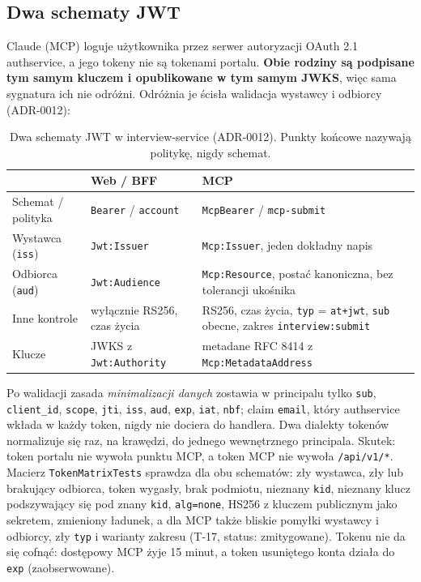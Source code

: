 \subsection{Dwa schematy JWT}

Claude (MCP) loguje użytkownika przez serwer autoryzacji OAuth 2.1 authservice, a jego tokeny
nie są tokenami portalu. \textbf{Obie rodziny są podpisane tym samym kluczem i
opublikowane w tym samym JWKS}, więc sama sygnatura ich nie odróżni. Odróżnia je
ścisła walidacja wystawcy i odbiorcy (ADR-0012):

\begin{table}[htbp]
\centering
\small
\begin{tabularx}{\linewidth}{@{}>{\raggedright\arraybackslash}p{2.7cm}>{\raggedright\arraybackslash}X>{\raggedright\arraybackslash}X@{}}
\toprule
 & \textbf{Web / BFF} & \textbf{MCP} \\
\midrule
Schemat / polityka & \texttt{Bearer} / \texttt{account} & \texttt{McpBearer} / \texttt{mcp-submit} \\
Wystawca (\texttt{iss}) & \texttt{Jwt:Issuer} & \texttt{Mcp:Issuer}, jeden dokładny napis \\
Odbiorca (\texttt{aud}) & \texttt{Jwt:Audience} & \texttt{Mcp:Resource}, postać kanoniczna, bez tolerancji ukośnika \\
Inne kontrole & wyłącznie RS256, czas życia & RS256, czas życia, \texttt{typ} = \texttt{at+jwt}, \texttt{sub} obecne, zakres \texttt{interview:submit} \\
Klucze & JWKS z \texttt{Jwt:Authority} & metadane RFC 8414 z \texttt{Mcp:MetadataAddress} \\
\bottomrule
\end{tabularx}
\caption{Dwa schematy JWT w interview-service (ADR-0012). Punkty końcowe nazywają politykę, nigdy schemat.}
\label{tab:p3-jwt}
\end{table}

Po walidacji zasada \emph{minimalizacji danych} zostawia w principalu tylko
\texttt{sub}, \texttt{client\_id}, \texttt{scope}, \texttt{jti}, \texttt{iss},
\texttt{aud}, \texttt{exp}, \texttt{iat}, \texttt{nbf}; claim \texttt{email}, który
authservice wkłada w każdy token, nigdy nie dociera do handlera. Dwa dialekty
tokenów normalizuje się raz, na krawędzi, do jednego wewnętrznego principala.
Skutek: token portalu nie wywoła punktu MCP, a token MCP nie wywoła
\texttt{/api/v1/*}. Macierz \texttt{TokenMatrixTests} sprawdza dla obu schematów:
zły wystawca, zły lub brakujący odbiorca, token wygasły, brak podmiotu, nieznany
\texttt{kid}, nieznany klucz podszywający się pod znany \texttt{kid}, \texttt{alg=none},
HS256 z kluczem publicznym jako sekretem, zmieniony ładunek, a dla MCP także
bliskie pomyłki wystawcy i odbiorcy, zły \texttt{typ} i warianty zakresu (T-17,
status: zmitygowane). Tokenu nie da się cofnąć: dostępowy MCP żyje 15 minut, a
token usuniętego konta działa do \texttt{exp} (zaobserwowane).

